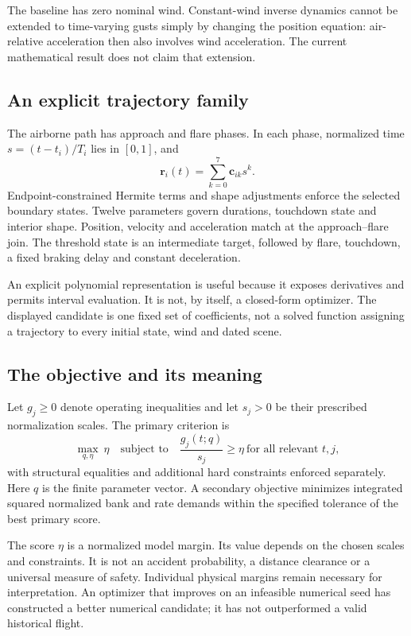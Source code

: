 The baseline has zero nominal wind. Constant-wind inverse dynamics cannot be extended to time-varying gusts simply by changing the position equation: air-relative acceleration then also involves wind acceleration. The current mathematical result does not claim that extension.

\subsection{An explicit trajectory family}
The airborne path has approach and flare phases. In each phase, normalized time $s=(t-t_i)/T_i$ lies in $[0,1]$, and
\begin{equation}
\mathbf r_i(t)=\sum_{k=0}^{7}\mathbf c_{ik}s^k.
\label{eq:poly}
\end{equation}
Endpoint-constrained Hermite terms and shape adjustments enforce the selected boundary states. Twelve parameters govern durations, touchdown state and interior shape. Position, velocity and acceleration match at the approach--flare join. The threshold state is an intermediate target, followed by flare, touchdown, a fixed braking delay and constant deceleration.

An explicit polynomial representation is useful because it exposes derivatives and permits interval evaluation. It is not, by itself, a closed-form optimizer. The displayed candidate is one fixed set of coefficients, not a solved function assigning a trajectory to every initial state, wind and dated scene.

\subsection{The objective and its meaning}
Let $g_j\geq0$ denote operating inequalities and let $s_j>0$ be their prescribed normalization scales. The primary criterion is
\begin{equation}
\max_{q,\eta}\ \eta\quad\text{subject to}\quad
\frac{g_j(t;q)}{s_j}\geq\eta\ \text{for all relevant }t,j,
\label{eq:objective}
\end{equation}
with structural equalities and additional hard constraints enforced separately. Here $q$ is the finite parameter vector. A secondary objective minimizes integrated squared normalized bank and rate demands within the specified tolerance of the best primary score.

The score $\eta$ is a normalized model margin. Its value depends on the chosen scales and constraints. It is not an accident probability, a distance clearance or a universal measure of safety. Individual physical margins remain necessary for interpretation. An optimizer that improves on an infeasible numerical seed has constructed a better numerical candidate; it has not outperformed a valid historical flight.

